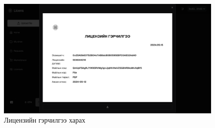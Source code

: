 \begin{figure}[h!]
	\centering
	\includegraphics[scale=0.16]{src/images/certification.png}
	\caption{Лицензийн гэрчилгээ харах}
\end{figure}